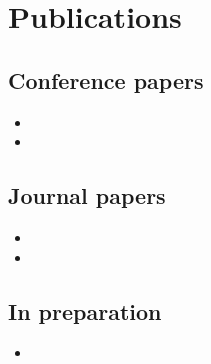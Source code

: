 \chapter{Publications}
\label{chap:publications}

\begin{refsection}
	\section*{Conference papers}
	
	\begin{itemize}
		\item 	{}
		\item	{}		
	\end{itemize}
	\section*{Journal papers}
	\begin{itemize}
		\item 	{}
		\item {}
	\end{itemize}
	\section*{In preparation}
	\begin{itemize}
		\item {}
	\end{itemize}
\end{refsection}